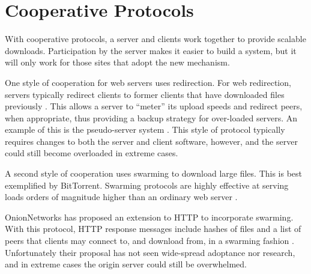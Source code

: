 
\section{Cooperative Protocols}

With cooperative protocols, a server and clients work together to provide scalable downloads.  Participation by the server makes it easier to build a system,
but it will only work for those sites that adopt the new mechanism.  

One style of cooperation for web servers uses redirection.  For web redirection, servers typically redirect clients to former clients that have downloaded files previously \cite{pseudoserving, coopnet}.  This allows a server to ``meter'' its upload speeds and redirect peers, when appropriate, thus providing a backup strategy for over-loaded servers.  An example of this is the pseudo-server system \cite{pseudoserving}.  This style of protocol typically requires changes to both the server and client software, however, and the server could still become overloaded in extreme cases.

A second style of cooperation uses swarming to download large files.  This is best exemplified by BitTorrent.  Swarming protocols are highly effective at serving loads orders of magnitude higher than an ordinary web server \cite{zappala}.

OnionNetworks has proposed an extension to HTTP to incorporate swarming.  With this protocol, 
HTTP response messages include hashes of files and a list of peers that clients
may connect to, and download from, in a swarming fashion \cite{onion}.  Unfortunately their proposal has not seen wide-spread adoptance nor research, and in extreme
cases the origin server could still be overwhelmed.


